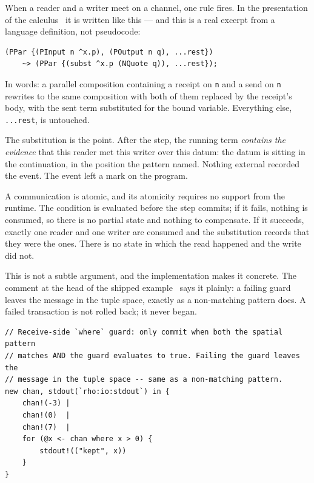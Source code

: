 When a reader and a writer meet on a channel, one rule fires. In the \flang{}
presentation of the calculus~\cite{mettailrust} it is written like this --- and this is a real
excerpt from a language definition, not pseudocode:

\begin{lstlisting}[language=mettail]
(PPar {(PInput n ^x.p), (POutput n q), ...rest})
    ~> (PPar {(subst ^x.p (NQuote q)), ...rest});
\end{lstlisting}

In words: a parallel composition containing a receipt on \texttt{n} and a send
on \texttt{n} rewrites to the same composition with both of them replaced by the
receipt's body, with the sent term substituted for the bound variable. Everything
else, \texttt{...rest}, is untouched.

The substitution is the point. After the step, the running term \emph{contains
the evidence} that this reader met this writer over this datum: the datum is
sitting in the continuation, in the position the pattern named. Nothing external
recorded the event. The event left a mark on the program.

\begin{claim}
\label{claim:witness}
A communication is atomic, and its atomicity requires no support from the
runtime. The condition is evaluated before the step commits; if it fails,
nothing is consumed, so there is no partial state and nothing to compensate. If
it succeeds, exactly one reader and one writer are consumed and the substitution
records that they were the ones. There is no state in which the read happened
and the write did not.
\end{claim}

This is not a subtle argument, and the implementation makes it concrete. The
comment at the head of the shipped example~\cite{f1r3node} says it plainly: a
failing guard
leaves the message in the tuple space, exactly as a non-matching pattern does. A
failed transaction is not rolled back; it never began.

\begin{lstlisting}
// Receive-side `where` guard: only commit when both the spatial pattern
// matches AND the guard evaluates to true. Failing the guard leaves the
// message in the tuple space -- same as a non-matching pattern.
new chan, stdout(`rho:io:stdout`) in {
    chan!(-3) |
    chan!(0)  |
    chan!(7)  |
    for (@x <- chan where x > 0) {
        stdout!(("kept", x))
    }
}
\end{lstlisting}

